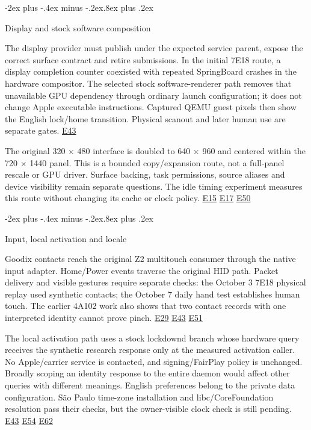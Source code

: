 \documentclass[10pt,letterpaper,twocolumn]{article}
\makeatletter
\renewcommand{\subsection}{\@startsection{subsection}{2}{0pt}
  {-2ex plus -.4ex minus -.2ex}{.8ex plus .2ex}
  {\normalfont\normalsize\bfseries\raggedright}}
\makeatother
\begin{document}
\subsection{Display and stock software composition}

The display provider must publish under the expected service parent, expose the correct surface contract and retire submissions. In the initial 7E18 route, a display completion counter coexisted with repeated SpringBoard crashes in the hardware compositor. The selected stock software-renderer path removes that unavailable GPU dependency through ordinary launch configuration; it does not change Apple executable instructions. Captured QEMU guest pixels then show the English lock/home transition. Physical scanout and later human use are separate gates. \hyperlink{e-E43}{\textsf{E43}}

The original 320 \(\times\) 480 interface is doubled to 640 \(\times\) 960 and centered within the 720 \(\times\) 1440 panel. This is a bounded copy/expansion route, not a full-panel rescale or GPU driver. Surface backing, task permissions, source aliases and device visibility remain separate questions. The idle timing experiment measures this route without changing its cache or clock policy. \hyperlink{e-E15}{\textsf{E15}} \hyperlink{e-E17}{\textsf{E17}} \hyperlink{e-E50}{\textsf{E50}}

\subsection{Input, local activation and locale}

Goodix contacts reach the original Z2 multitouch consumer through the native input adapter. Home/Power events traverse the original HID path. Packet delivery and visible gestures require separate checks: the October 3 7E18 physical replay used synthetic contacts; the October 7 daily hand test establishes human touch. The earlier 4A102 work also shows that two contact records with one interpreted identity cannot prove pinch. \hyperlink{e-E29}{\textsf{E29}} \hyperlink{e-E43}{\textsf{E43}} \hyperlink{e-E51}{\textsf{E51}}

The local activation path uses a stock lockdownd branch whose hardware query receives the synthetic research response only at the measured activation caller. No Apple/carrier service is contacted, and signing/FairPlay policy is unchanged. Broadly scoping an identity response to the entire daemon would affect other queries with different meanings. English preferences belong to the private data configuration. São Paulo time-zone installation and libc/CoreFoundation resolution pass their checks, but the owner-visible clock check is still pending. \hyperlink{e-E43}{\textsf{E43}} \hyperlink{e-E54}{\textsf{E54}} \hyperlink{e-E62}{\textsf{E62}}
\end{document}
